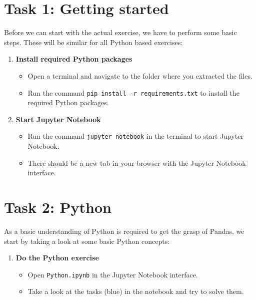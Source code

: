 \documentclass[
english,
smallborders
]{../i6prcsht}
\begin{document}
\section*{Task 1: Getting started}

Before we can start with the actual exercise, we have to perform some basic steps. These will be similar for all Python based exercises:

\begin{enumerate}
	\item \textbf{Install required Python packages}

	      \begin{itemize}
		      \item Open a terminal and navigate to the folder where you extracted the files.
		      \item Run the command \texttt{pip install -r requirements.txt} to install the required Python packages.
	      \end{itemize}

	\item \textbf{Start Jupyter Notebook}

	      \begin{itemize}
		      \item Run the command \texttt{jupyter notebook} in the terminal to start Jupyter Notebook.
		      \item There should be a new tab in your browser with the Jupyter Notebook interface.
	      \end{itemize}
\end{enumerate}

\section*{Task 2: Python}

As a basic understanding of Python is required to get the grasp of Pandas, we start by taking a look at some basic Python concepts:

\begin{enumerate}
	\item \textbf{Do the Python exercise} %

	      \begin{itemize}
		      \item Open \texttt{Python.ipynb} in the Jupyter Notebook interface.
		      \item Take a look at the tasks (blue) in the notebook and try to solve them.
	      \end{itemize}
\end{enumerate}
\end{document}
